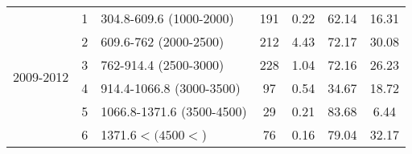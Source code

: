 \begin{table}[htbp]
\begin{tabular}{rrlcccc}
    \multicolumn{1}{c}{\multirow{6}[2]{*}{\begin{sideways}2009-2012\end{sideways}}} & \multicolumn{1}{c}{1} & \multicolumn{1}{l}{304.8-609.6 (1000-2000)} & 191   & 0.22  & 62.14  & 16.31  \\
    \multicolumn{1}{c}{} & \multicolumn{1}{c}{2} & \multicolumn{1}{l}{609.6-762 (2000-2500)} & 212   & 4.43  & 72.17  & 30.08  \\
    \multicolumn{1}{c}{} & \multicolumn{1}{c}{3} & \multicolumn{1}{l}{762-914.4 (2500-3000)} & 228   & 1.04  & 72.16  & 26.23  \\
    \multicolumn{1}{c}{} & \multicolumn{1}{c}{4} & \multicolumn{1}{l}{914.4-1066.8 (3000-3500)} & 97    & 0.54  & 34.67  & 18.72  \\
    \multicolumn{1}{c}{} & \multicolumn{1}{c}{5} & \multicolumn{1}{l}{1066.8-1371.6 (3500-4500)} & 29    & 0.21  & 83.68  & 6.44  \\
    \multicolumn{1}{c}{} & \multicolumn{1}{c}{6} & \multicolumn{1}{l}{1371.6$< (4500<$)} & 76    & 0.16  & 79.04  & 32.17  \\
    \bottomrule
    \end{tabular}%
  \label{tab:DSNO3}%
\end{table}%
